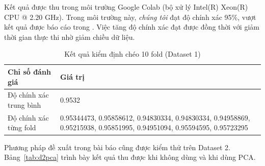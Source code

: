 Kết quả được thu trong môi trường Google Colab (bộ xử lý Intel(R) Xeon(R) CPU @ 2.20 GHz). Trong môi trường này, \textit{chúng tôi} đạt độ chính xác 95\%, vượt kết quả được báo cáo trong . Việc tăng độ chính xác đạt được đồng thời với giảm thời gian thực thi nhờ giảm chiều dữ liệu.

\begin{table}[H]
\centering
\caption{Kết quả kiểm định chéo 10 fold (Dataset 1)}\label{tab:cv1}
\begin{tabularx}{\textwidth}{lX}
\toprule
\textbf{Chỉ số đánh giá} & \textbf{Giá trị}\\
\midrule
Độ chính xác trung bình & 0.9532\\
Độ chính xác từng fold & 0.95344473, 0.95858612, 0.94830334, 0.94830334, 0.94958869, 0.95215938, 0.95851995, 0.94951094, 0.95594595, 0.95723295\\
\bottomrule
\end{tabularx}
\end{table}

Phương pháp đề xuất trong bài báo cũng được kiểm thử trên Dataset 2. Bảng~\ref{tab:d2pca} trình bày kết quả thu được khi không dùng và khi dùng PCA.

\begin{table}[H]
\centering
\caption{So sánh kết quả thu được khi không dùng và khi dùng PCA}\label{tab:d2pca}
\end{table}

